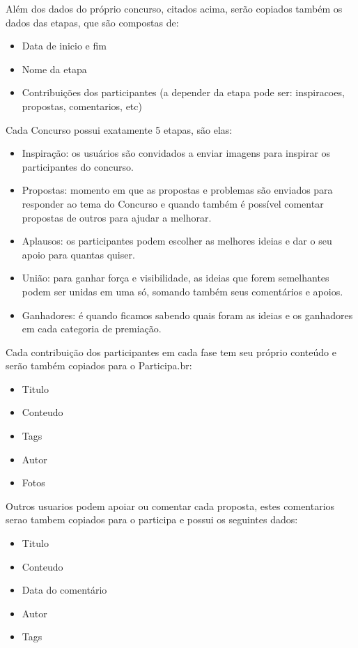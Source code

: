 \documentclass[12pt]{article}
\begin{document}
Além dos dados do próprio concurso, citados acima, serão copiados também os
dados das etapas, que são compostas de:

\begin{itemize}
  \item Data de inicio e fim
  \item Nome da etapa
  \item Contribuições dos participantes (a depender da etapa pode ser: inspiracoes, propostas, comentarios, etc)
\end{itemize}

Cada Concurso possui exatamente 5 etapas, são elas:

\begin{itemize}
  \item Inspiração: os usuários são convidados a enviar imagens para inspirar os participantes do concurso.
  \item Propostas: momento em que as propostas e problemas são enviados para responder ao tema do Concurso e quando também é possível comentar propostas de outros para ajudar a melhorar.
  \item Aplausos: os participantes podem escolher as melhores ideias e dar o seu apoio para quantas quiser.
  \item União: para ganhar força e visibilidade, as ideias que forem semelhantes podem ser unidas em uma só, somando também seus comentários e apoios.
  \item Ganhadores: é quando ficamos sabendo quais foram as ideias e os ganhadores em cada categoria de premiação.
\end{itemize}

Cada contribuição dos participantes em cada fase tem seu próprio conteúdo e
serão também copiados para o Participa.br:

\begin{itemize}
  \item Titulo
  \item Conteudo
  \item Tags
  \item Autor
  \item Fotos
\end{itemize}

Outros usuarios podem apoiar ou comentar cada proposta, estes comentarios
serao tambem copiados para o participa e possui os seguintes dados:

\begin{itemize}
  \item Titulo
  \item Conteudo
  \item Data do comentário
  \item Autor
  \item Tags
\end{itemize}
\end{document}
